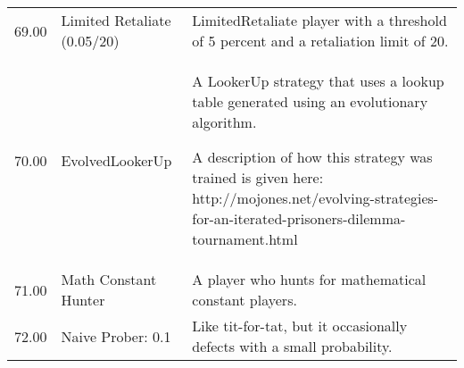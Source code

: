 \begin{table}[!hbtp]
\begin{adjustbox}{width=2\textwidth, angle=90}
\begin{tabular}{rll}
	69.00  & Limited Retaliate (0.05/20) & LimitedRetaliate player with a threshold of 5 percent and a
	retaliation limit of 20.                                                                                                                                                                                                                                                                                                                                                                                                                                                                                                                                                                                                                                                                                                                                                                                                                                                                                                                                 \\
	70.00  & EvolvedLookerUp             & A LookerUp strategy that uses a lookup table generated using an evolutionary
	algorithm.

	A description of how this strategy was trained is given here:
	http://mojones.net/evolving-strategies-for-an-iterated-prisoners-dilemma-tournament.html                                                                                                                                                                                                                                                                                                                                                                                                                                                                                                                                                                                                                                                                                                                                                              \\
	71.00  & Math Constant Hunter        & A player who hunts for mathematical constant players.                                                                             \\
	72.00  & Naive Prober: 0.1           & Like tit-for-tat, but it occasionally defects with a small probability.


\end{tabular}
\end{adjustbox}
\end{table}

